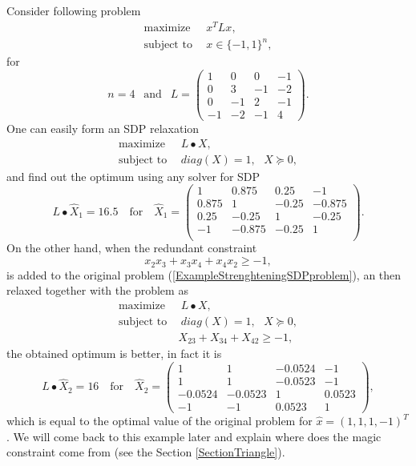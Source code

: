 \documentclass[12pt]{book}
\theoremstyle{definition}
\begin{document}
\ex %
\label{ExampleStrenghteningSDP}
Consider following problem
\begin{equation}
\begin{array}{ll}
\label{ExampleStrenghteningSDPproblem}
\mbox{maximize}&\ \ x^TLx, \\
\mbox{subject to}&\ \ x\in\{-1,1\}^n,
\end{array}
\end{equation}
for $$n = 4 \ \ \mbox{ and } \ \
L = \left(\begin{array}{rrrr}
     1  &   0  &   0  &  -1\\
     0  &   3  &  -1  &  -2\\
     0  &  -1  &   2  &  -1\\
    -1  &  -2  &  -1  &   4
\end{array}\right).
$$
One can easily form an SDP relaxation 
\begin{equation*}
\begin{array}{ll}
\mbox{maximize}&\ \ L\bullet X, \\
\mbox{subject to}&\ \ diag(X) = 1, \ \ \ X\succeq 0,
\end{array}
\end{equation*}
and find out the optimum using any solver for SDP
$$ L\bullet\hat{X}_1 = 16.5 \ \ \ \mbox{ for } \ \ \ \hat{X}_1 = \left(\begin{array}{rrrr}
    1  &  0.875 &   0.25 &  -1\\
    0.875  &  1 &  -0.25 &  -0.875\\
    0.25  & -0.25 &   1 &  -0.25\\
   -1  & -0.875 &  -0.25 &   1\\
\end{array}\right) .
$$
On the other hand, when the redundant constraint
$$x_2x_3 + x_3x_4 + x_4x_2 \geq -1,$$
is added to the original problem (\ref{ExampleStrenghteningSDPproblem}), an then relaxed together with the problem as 
\begin{equation*}
\begin{array}{ll}
\mbox{maximize}&\ \ L\bullet X, \\
\mbox{subject to}&\ \ diag(X) = 1, \ \ \ X\succeq 0,\\
				& \ X_{23} + X_{34} + X_{42} \geq -1,
\end{array}
\end{equation*}
the obtained optimum is better, in fact it is 
$$ L\bullet\hat{X}_2 = 16 \ \ \ \mbox{ for } \ \ \ \hat{X}_2 = \left(\begin{array}{rrrr}
	1		&  1	   & -0.0524 &  -1		\\
    1		&  1	   & -0.0523 &  -1		\\
   -0.0524  & -0.0523  &  1	 	 &   0.0523	\\
   -1		& -1	   &  0.0523 &   1		
\end{array}\right) ,
$$
which is equal to the optimal value of the original problem for $\hat{x} = (1,1,1,-1)^T$. We will come back to this example later and explain where does the magic constraint come from (see the Section \ref{SectionTriangle}).
\end{document}
